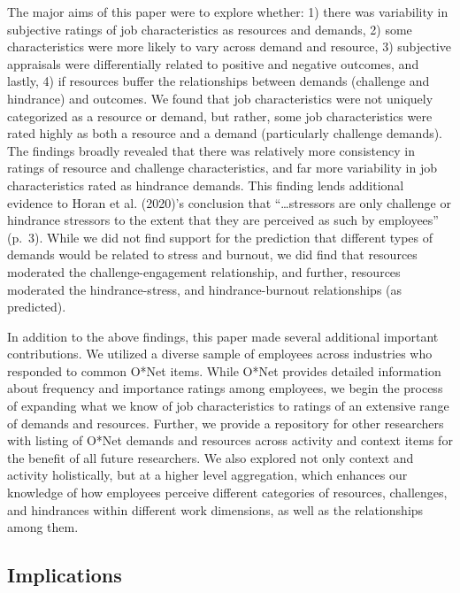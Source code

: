 \documentclass[
  man]{apa7}
\begin{document}
The major aims of this paper were to explore whether: 1) there was variability in subjective ratings of job characteristics as resources and demands, 2) some characteristics were more likely to vary across demand and resource, 3) subjective appraisals were differentially related to positive and negative outcomes, and lastly, 4) if resources buffer the relationships between demands (challenge and hindrance) and outcomes. We found that job characteristics were not uniquely categorized as a resource or demand, but rather, some job characteristics were rated highly as both a resource and a demand (particularly challenge demands). The findings broadly revealed that there was relatively more consistency in ratings of resource and challenge characteristics, and far more variability in job characteristics rated as hindrance demands. This finding lends additional evidence to Horan et al. (2020)'s conclusion that ``\ldots stressors are only challenge or hindrance stressors to the extent that they are perceived as such by employees'' (p.~3). While we did not find support for the prediction that different types of demands would be related to stress and burnout, we did find that resources moderated the challenge-engagement relationship, and further, resources moderated the hindrance-stress, and hindrance-burnout relationships (as predicted).

In addition to the above findings, this paper made several additional important contributions. We utilized a diverse sample of employees across industries who responded to common O*Net items. While O*Net provides detailed information about frequency and importance ratings among employees, we begin the process of expanding what we know of job characteristics to ratings of an extensive range of demands and resources. Further, we provide a repository for other researchers with listing of O*Net demands and resources across activity and context items for the benefit of all future researchers. We also explored not only context and activity holistically, but at a higher level aggregation, which enhances our knowledge of how employees perceive different categories of resources, challenges, and hindrances within different work dimensions, as well as the relationships among them.

\subsection{Implications}\label{implications}
\end{document}
